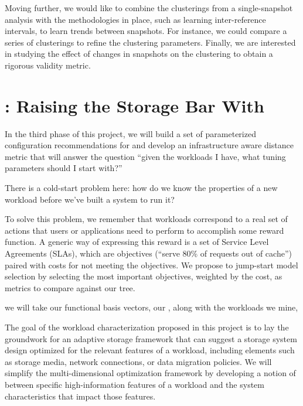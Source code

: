 Moving further, we would like to combine the clusterings from a single-snapshot
analysis with the methodologies in place, such as learning inter-reference
intervals, to learn trends between snapshots.
For instance, we could compare a
series of clusterings to refine the clustering parameters.  Finally, we are
interested in studying the effect of changes in snapshots on the clustering to
obtain a rigorous validity metric.
\section{\at{}: Raising the Storage Bar With \Mws}%


In the third phase of this project, we will build a set of parameterized configuration
recommendations for \mws and develop an infrastructure aware distance metric
that will answer the question ``given the workloads I have, what tuning
parameters should I start with?''

There is a cold-start problem here: how do we know the properties of a new
workload before we've built a system to run it?  

To solve this problem, we remember that workloads correspond to a real set of
actions that users or applications need to perform to accomplish some reward
function.  A generic way of expressing this reward is a set of Service Level
Agreements (SLAs), which are objectives (\eg ``serve 80\% of requests out of
cache'') paired with costs for not meeting the objectives.  We propose to
jump-start model selection by selecting the most important objectives, weighted
by the cost, as metrics to compare against our \mws tree.



we will take our functional basis vectors,
our \mWs, along with the workloads we mine, %


The goal of the workload characterization proposed in this project is to lay
the groundwork for an adaptive storage framework that can suggest a 
storage system design optimized for the relevant features of a workload, including elements such as storage media, network
connections, or data migration policies.  We will simplify the multi-dimensional
optimization framework by developing a notion of \systemfit between specific
high-information features of a workload and the system characteristics that
impact those features.  %

